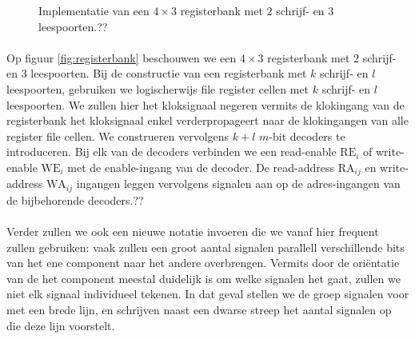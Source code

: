 \begin{figure}[hbt]
\caption{Implementatie van een $4\times 3$ registerbank met $2$ schrijf- en $3$ leespoorten.??}
\end{figure}
\paragraph{}
Op figuur \ref{fig:registerbank} beschouwen we een $4\times 3$ registerbank met $2$ schrijf- en $3$ leespoorten. Bij de constructie van een registerbank met $k$ schrijf- en $l$ leespoorten, gebruiken we logischerwijs file register cellen met $k$ schrijf- en $l$ leespoorten. We zullen hier het kloksignaal negeren vermits de klokingang van de registerbank het kloksignaal enkel verderpropageert naar de klokingangen van alle register file cellen. We construeren vervolgens $k+l$ $m$-bit decoders te introduceren. Bij elk van de decoders verbinden we een read-enable $\mbox{RE}_i$ of write-enable $\mbox{WE}_i$ met de enable-ingang van de decoder. De read-address $\mbox{RA}_{ij}$ en write-address $\mbox{WA}_{ij}$ ingangen leggen vervolgens signalen aan op de adres-ingangen van de bijbehorende decoders.??
\paragraph{}
Verder zullen we ook een nieuwe notatie invoeren die we vanaf hier frequent zullen gebruiken: vaak zullen een groot aantal signalen parallell verschillende bits van het ene component naar het andere overbrengen. Vermits door de ori\"entatie van de het component meestal duidelijk is om welke signalen het gaat, zullen we niet elk signaal individueel tekenen. In dat geval stellen we de groep signalen voor met een brede lijn, en schrijven naast een dwarse streep het aantal signalen op die deze lijn voorstelt.
